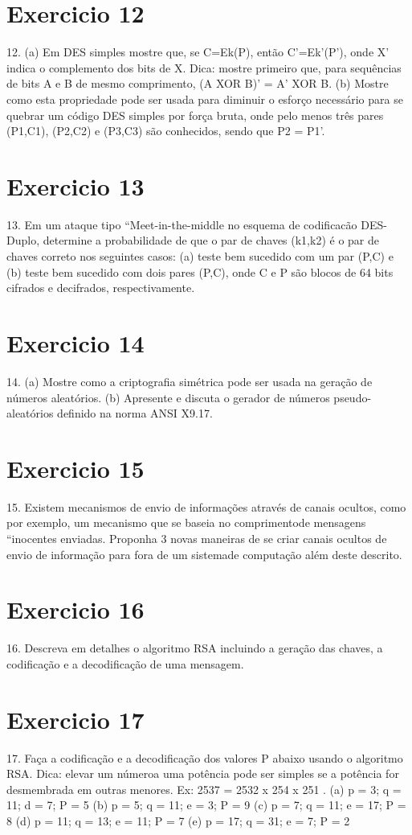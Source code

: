 \documentclass[10pt,a4paper]{report}
\begin{document}
\section{Exercicio 12}
12. (a) Em DES simples mostre que, se C=Ek(P), então C'=Ek'(P'), onde X' indica o complemento dos bits de X. Dica: mostre primeiro que, para sequências de bits A e B de mesmo comprimento, (A XOR B)' = A' XOR B.
(b) Mostre como esta propriedade pode ser usada para diminuir o esforço necessário para se quebrar um código DES simples por força bruta, onde pelo menos três pares (P1,C1), (P2,C2) e (P3,C3) são conhecidos, sendo que P2 = P1'.
\section{Exercicio 13}
13. Em um ataque tipo ``Meet-in-the-middle no esquema de codificacão DES-Duplo, determine a probabilidade de que o par de chaves (k1,k2) é o par de chaves correto nos seguintes casos: (a) teste bem sucedido com um par (P,C) e (b) teste bem sucedido com dois pares (P,C), onde C e P são blocos de 64 bits cifrados e decifrados, respectivamente.
\section{Exercicio 14}
14. (a) Mostre como a criptografia simétrica pode ser usada na geração de números aleatórios.
(b) Apresente e discuta o gerador de números pseudo-aleatórios definido na norma ANSI X9.17.
\section{Exercicio 15}
15. Existem mecanismos de envio de informações através de canais ocultos, como por exemplo, um mecanismo que se baseia no comprimentode mensagens ``inocentes enviadas. Proponha 3 novas maneiras de se criar canais ocultos de envio de informação para fora de um sistemade computação além deste descrito.
\section{Exercicio 16}
16. Descreva em detalhes o algoritmo RSA incluindo a geração das chaves, a codificação e a decodificação de uma mensagem.
\section{Exercicio 17}
17. Faça a codificação e a decodificação dos valores P abaixo usando o algoritmo RSA. Dica: elevar um númeroa uma potência pode ser simples se a potência for desmembrada em outras menores. Ex: 2537 = 2532 x 254 x 251 .
(a) p = 3; q = 11; d = 7; P = 5
(b) p = 5; q = 11; e = 3; P = 9
(c) p = 7; q = 11; e = 17; P = 8
(d) p = 11; q = 13; e = 11; P = 7
(e) p = 17; q = 31; e = 7; P = 2
\end{document}
